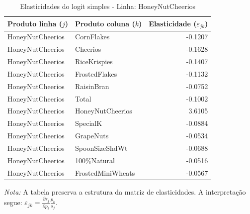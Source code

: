 \begingroup
\begin{table}[H]
\centering
\caption{Elasticidades do logit simples - Linha: HoneyNutCheerios}
\label{tab:elas-honeynutcheerios}
\small
\begin{tabular}{llr}
\toprule
Produto linha ($j$) & Produto coluna ($k$) & Elasticidade ($\varepsilon_{jk}$) \\
\midrule
HoneyNutCheerios & CornFlakes & -0.1207 \\
HoneyNutCheerios & Cheerios & -0.1628 \\
HoneyNutCheerios & RiceKrispies & -0.1407 \\
HoneyNutCheerios & FrostedFlakes & -0.1132 \\
HoneyNutCheerios & RaisinBran & -0.0752 \\
HoneyNutCheerios & Total & -0.1002 \\
HoneyNutCheerios & HoneyNutCheerios & 3.6105 \\
HoneyNutCheerios & SpecialK & -0.0884 \\
HoneyNutCheerios & GrapeNuts & -0.0534 \\
HoneyNutCheerios & SpoonSizeShdWt & -0.0688 \\
HoneyNutCheerios & 100\%Natural & -0.0516 \\
HoneyNutCheerios & FrostedMiniWheats & -0.0567 \\
\bottomrule
\end{tabular}

\vspace{0.3em}
\footnotesize
\textit{Nota:} A tabela preserva a estrutura da matriz de elasticidades. A interpretação segue: $\varepsilon_{jk}=\frac{\partial s_j}{\partial p_k}\frac{p_k}{s_j}$.
\end{table}
\endgroup


